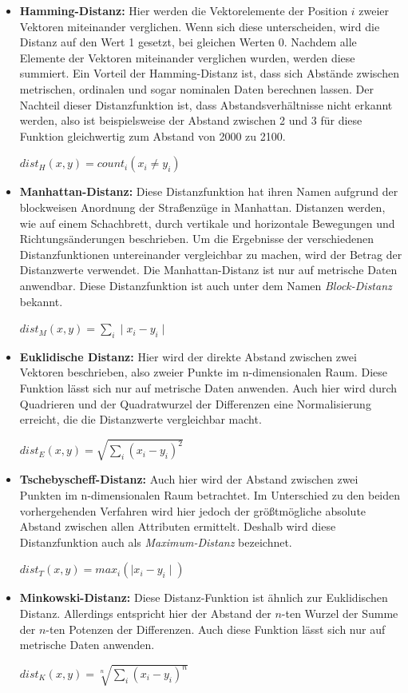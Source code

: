 \begin{itemize}
\item \textbf{Hamming-Distanz:} Hier werden die Vektorelemente der Position \(i\) zweier Vektoren miteinander verglichen. Wenn sich diese unterscheiden, wird die Distanz auf den Wert 1 gesetzt, bei gleichen Werten 0. Nachdem alle Elemente der Vektoren miteinander verglichen wurden, werden diese summiert. Ein Vorteil der Hamming-Distanz ist, dass sich Abstände zwischen metrischen, ordinalen und sogar nominalen Daten berechnen lassen. Der Nachteil dieser Distanzfunktion ist, dass Abstandsverhältnisse nicht erkannt werden, also ist beispielsweise der Abstand zwischen 2 und 3 für diese Funktion gleichwertig zum Abstand von 2000 zu 2100.

\(dist_H(x,y) = count_i(x_i \neq y_i) \)

\item \textbf{Manhattan-Distanz:} Diese Distanzfunktion hat ihren Namen aufgrund der blockweisen Anordnung der Straßenzüge in Manhattan. Distanzen werden, wie auf einem Schachbrett, durch vertikale und horizontale Bewegungen und Richtungsänderungen beschrieben. Um die Ergebnisse der verschiedenen Distanzfunktionen untereinander vergleichbar zu machen, wird der Betrag der Distanzwerte verwendet. Die Manhattan-Distanz ist nur auf metrische Daten anwendbar. Diese Distanzfunktion ist auch unter dem Namen \textit{Block-Distanz} bekannt.   

\(dist_M(x,y) = \sum_{i} \mid x_i - y_i \mid \)


\item \textbf{Euklidische Distanz:} Hier wird der direkte Abstand zwischen zwei Vektoren beschrieben, also zweier Punkte im n-dimensionalen Raum. Diese Funktion lässt sich nur auf metrische Daten anwenden. Auch hier wird durch Quadrieren und der Quadratwurzel der Differenzen eine Normalisierung erreicht, die die Distanzwerte vergleichbar macht. 

\(dist_E(x,y) = \sqrt{\sum_{i}(x_i - y_i)^2} \)

\item \textbf{Tschebyscheff-Distanz:}  Auch hier wird der Abstand zwischen zwei Punkten im n-dimensionalen Raum betrachtet. Im Unterschied zu den beiden vorhergehenden Verfahren wird hier jedoch der größtmögliche absolute Abstand zwischen allen Attributen ermittelt. Deshalb wird diese Distanzfunktion auch als \textit{Maximum-Distanz}  bezeichnet. 

\(dist_T(x,y) = max_i(\mid x_i - y_i \mid) \)

\item \textbf{Minkowski-Distanz:}  Diese Distanz-Funktion ist ähnlich zur Euklidischen Distanz. Allerdings entspricht hier der Abstand der \(n\)-ten Wurzel der Summe der  \(n\)-ten Potenzen der Differenzen. Auch diese Funktion lässt sich nur auf metrische Daten anwenden.

\(dist_K(x,y) = \sqrt[n]{\sum_{i}(x_i - y_i)^n} \)

\end{itemize}


